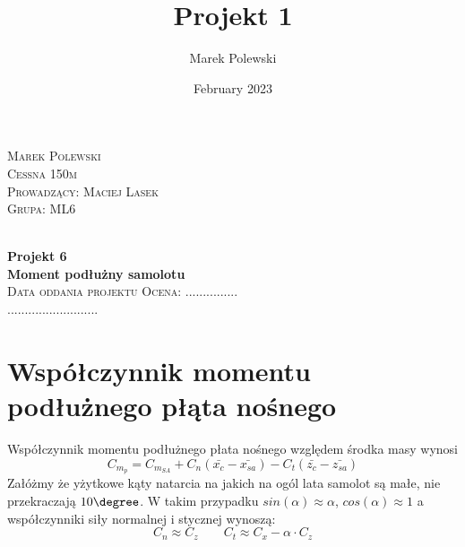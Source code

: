 \documentclass[a4paper, twoside]{report}
\title{Projekt 1}
\author{Marek Polewski}
\date{February 2023}
\begin{document}
\pagestyle{fancy}
\fancyhf{}
\fancyfoot[LE,RO]{\thepage}


\begin{titlepage}


\begin{center}

\begin{flushright}
    \textsc{\Large Marek Polewski}\\ [0.1cm]
    \textsc{\Large Cessna 150m }\\[0.1cm]
    \textsc{\Large Prowadzący: Maciej Lasek}\\[0.1cm]
    \textsc{\Large Grupa: ML6}\\[0.1cm]

\end{flushright}

\\[5cm]

{ \huge \bfseries Projekt 6}\\[0.4cm]
{ \huge \bfseries Moment podłużny samolotu}\\[0.4cm]


\vfill
\flushleft
\textsc{\Large Data oddania projektu} \hfill  \textsc{\Large Ocena: ...............}\\ [0.3cm]
\textsc{\Large ..........................} 

\end{center}
\end{titlepage}

\leavevmode\thispagestyle{empty}\newpage
\tableofcontents

\FloatBarrier
\setcounter{page}{1}

\renewcommand\thesection{\arabic{section}}

\section{Współczynnik momentu podłużnego płąta nośnego}
Współczynnik momentu podłużnego płata nośnego względem środka masy wynosi
\[
C_{m_p}=C_{m_{SA}}+C_n (\bar{x_c} - \bar{x_{sa}}) - C_t (\bar{z_c} - \bar{z_{sa}})
\]
Załóżmy że yżytkowe kąty natarcia na jakich na ogól lata samolot są małe, nie przekraczają $10 \degree$. W takim przypadku $sin (\alpha) \approx \alpha $, $cos(\alpha) \approx 1$ a współczynniki siły normalnej i stycznej wynoszą:
$$
C_n \approx C_z \qquad  C_{t} \approx C_x -\alpha \cdot C_z
$$
\end{document}

